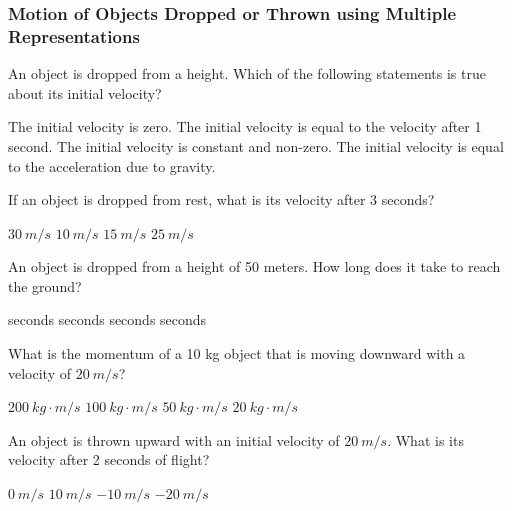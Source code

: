 \documentclass[../main-physics-problems.tex]{subfiles}
\begin{document}
\clearpage

\subsubsection{Motion of Objects Dropped or Thrown using Multiple Representations}

\begin{questions}
\question  
An object is dropped from a height. Which of the following statements is true about its initial velocity?  

\begin{randomizechoices}  
    \correctchoice The initial velocity is zero.  
    \choice The initial velocity is equal to the velocity after 1 second.  
    \choice The initial velocity is constant and non-zero.  
    \choice The initial velocity is equal to the acceleration due to gravity.  
\end{randomizechoices}  

\question  
If an object is dropped from rest, what is its velocity after 3 seconds?  

\begin{randomizechoices}  
    \correctchoice \(\SI{30}{m/s}\)  
    \choice \(\SI{10}{m/s}\)  
    \choice \(\SI{15}{m/s}\)  
    \choice \(\SI{25}{m/s}\)  
\end{randomizechoices}  


\question  
An object is dropped from a height of 50 meters. How long does it take to reach the ground?  

\begin{randomizechoices}  
     seconds  
     seconds  
     seconds  
     seconds  
\end{randomizechoices}  


\question  
What is the momentum of a 10 kg object that is moving downward with a velocity of \(\SI{20}{m/s}\)?  

\begin{randomizechoices}  
    \correctchoice \(\SI{200}{kg \cdot m/s}\)  
    \choice \(\SI{100}{kg \cdot m/s}\)  
    \choice \(\SI{50}{kg \cdot m/s}\)  
    \choice \(\SI{20}{kg \cdot m/s}\)  
\end{randomizechoices}  


\question  
An object is thrown upward with an initial velocity of \(\SI{20}{m/s}\). What is its velocity after 2 seconds of flight?  

\begin{randomizechoices}  
    \correctchoice \(\SI{0}{m/s}\)  
    \choice \(\SI{10}{m/s}\)  
    \choice \(\SI{-10}{m/s}\)  
    \choice \(\SI{-20}{m/s}\)  
\end{randomizechoices}  



\end{questions}
\end{document}
